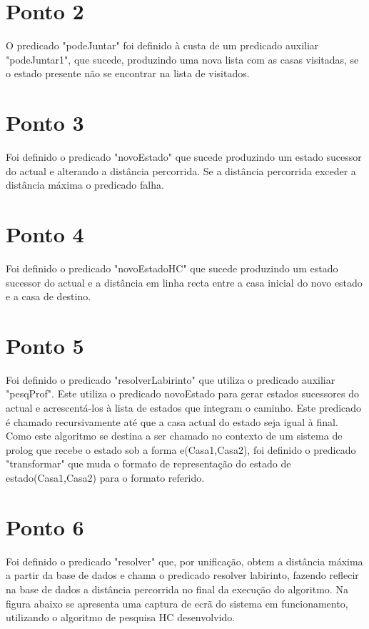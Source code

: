\documentclass[11pt]{report}
\begin{document}
\section{Ponto 2}
	O predicado "podeJuntar" foi definido à custa de um predicado auxiliar "podeJuntar1", que sucede, produzindo uma nova lista com as casas visitadas, se o estado presente não se encontrar na lista de visitados.

\section{Ponto 3}
	Foi definido o predicado "novoEstado" que sucede produzindo um estado sucessor do actual e alterando a distância percorrida. Se a distância percorrida exceder a distância máxima o predicado falha.

\section{Ponto 4}
	Foi definido o predicado "novoEstadoHC" que sucede produzindo um estado sucessor do actual e a distância em linha recta entre a casa inicial do novo estado e a casa de destino.

\section{Ponto 5}
	Foi definido o predicado "resolverLabirinto" que utiliza o predicado auxiliar "pesqProf". Este utiliza o predicado novoEstado para gerar estados sucessores do actual e acrescentá-los à lista de estados que integram o caminho. Este predicado é chamado recursivamente até que a casa actual do estado seja igual à final. Como este algoritmo se destina a ser chamado no contexto de um sistema de prolog que recebe o estado sob a forma e(Casa1,Casa2), foi definido o predicado "transformar" que muda o formato de representação do estado de estado(Casa1,Casa2) para o formato referido.

\section{Ponto 6}
	Foi definido o predicado "resolver" que, por unificação, obtem a distância máxima a partir da base de dados e chama o predicado resolver labirinto, fazendo reflecir na base de dados a distância percorrida no final da execução do algoritmo. Na figura abaixo se apresenta uma captura de ecrã do sistema em funcionamento, utilizando o algoritmo de pesquisa HC desenvolvido.
	
\end{document}
